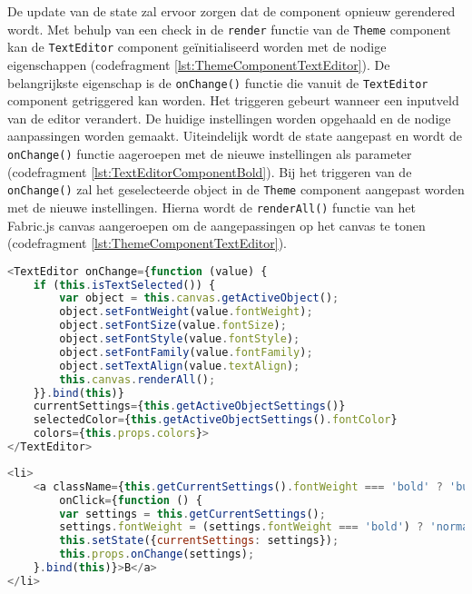 De update van de state zal ervoor zorgen dat de component opnieuw gerendered wordt. Met behulp van een check in de \lstinline{render} functie van de \lstinline{Theme} component kan de \lstinline{TextEditor} component ge\"{i}nitialiseerd worden met de nodige eigenschappen (codefragment \ref{lst:ThemeComponentTextEditor}). De belangrijkste eigenschap is de \lstinline{onChange()} functie die vanuit de \lstinline{TextEditor} component getriggered kan worden. Het triggeren gebeurt wanneer een inputveld van de editor verandert. De huidige instellingen worden opgehaald en de nodige aanpassingen worden gemaakt. Uiteindelijk wordt de state aangepast en wordt de \lstinline{onChange()} functie aageroepen met de nieuwe instellingen als parameter (codefragment \ref{lst:TextEditorComponentBold}). Bij het triggeren van de \lstinline{onChange()} zal het geselecteerde object in de \lstinline{Theme} component aangepast worden met de nieuwe instellingen. Hierna wordt de \lstinline{renderAll()} functie van het Fabric.js canvas aangeroepen om de aangepassingen op het canvas te tonen (codefragment \ref{lst:ThemeComponentTextEditor}).

\begin{lstlisting}[caption={Theme component - Text editor},label=lst:ThemeComponentTextEditor,language=javascript]
<TextEditor onChange={function (value) {
	if (this.isTextSelected()) {
		var object = this.canvas.getActiveObject();
		object.setFontWeight(value.fontWeight);
		object.setFontSize(value.fontSize);
		object.setFontStyle(value.fontStyle);
		object.setFontFamily(value.fontFamily);
		object.setTextAlign(value.textAlign);
		this.canvas.renderAll();
	}}.bind(this)}
	currentSettings={this.getActiveObjectSettings()}
	selectedColor={this.getActiveObjectSettings().fontColor}
	colors={this.props.colors}>
</TextEditor>
\end{lstlisting}

\begin{lstlisting}[caption={TextEditor component - toggle bold},label=lst:TextEditorComponentBold,language=javascript]
<li>
	<a className={this.getCurrentSettings().fontWeight === 'bold' ? 'button primary' : 'button'}
		onClick={function () {
		var settings = this.getCurrentSettings();
		settings.fontWeight = (settings.fontWeight === 'bold') ? 'normal' : 'bold';
		this.setState({currentSettings: settings});
		this.props.onChange(settings);
	}.bind(this)}>B</a>
</li>
\end{lstlisting}


